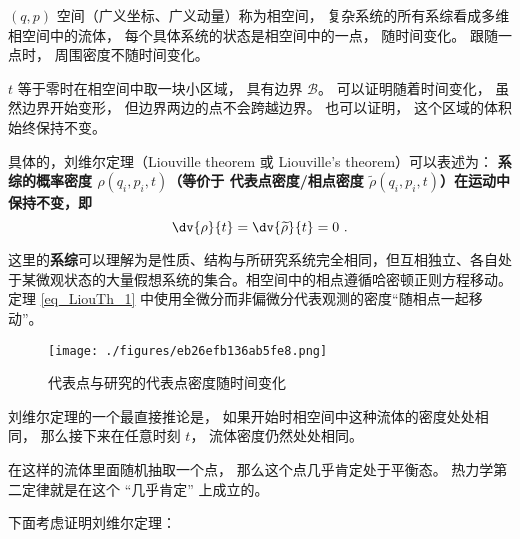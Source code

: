 
\begin{issues}
\issueDraft
\end{issues}

$(q, p)$ 空间（广义坐标、广义动量）称为相空间， 复杂系统的所有系综看成多维相空间中的流体， 每个具体系统的状态是相空间中的一点， 随时间变化。 跟随一点时， 周围密度不随时间变化。

$t$ 等于零时在相空间中取一块小区域， 具有边界 $\mathcal B$。 可以证明随着时间变化， 虽然边界开始变形， 但边界两边的点不会跨越边界。 也可以证明， 这个区域的体积始终保持不变。

具体的，刘维尔定理（Liouville theorem 或 Liouville's theorem）可以表述为：
\textbf{系综的概率密度 $\rho(q_i, p_i, t)$（等价于 代表点密度/相点密度 $\widetilde \rho(q_i, p_i, t)$）在运动中保持不变，即}
\begin{equation}\label{eq_LiouTh_1}
\dv{\rho}{t} = \dv{\widetilde{\rho}}{t} = 0 ~.
\end{equation}

这里的\textbf{系综}可以理解为是性质、结构与所研究系统完全相同，但互相独立、各自处于某微观状态的大量假想系统的集合。相空间中的相点遵循哈密顿正则方程移动。定理 \autoref{eq_LiouTh_1} 中使用全微分而非偏微分代表观测的密度“随相点一起移动”。

\begin{figure}[ht]
\centering
\texttt{[image: ./figures/eb26efb136ab5fe8.png]}
\caption{代表点与研究的代表点密度随时间变化} \label{fig_LiouTh_2}
\end{figure}




刘维尔定理的一个最直接推论是， 如果开始时相空间中这种流体的密度处处相同， 那么接下来在任意时刻 $t$， 流体密度仍然处处相同。

在这样的流体里面随机抽取一个点， 那么这个点几乎肯定处于平衡态。 热力学第二定律就是在这个 “几乎肯定” 上成立的。


















下面考虑证明刘维尔定理：

